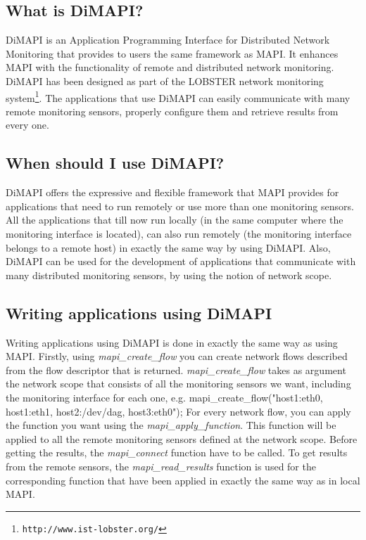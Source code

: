 \documentclass[a4paper, 11pt]{article}
\newenvironment{code}{\small\verbatim}{\endverbatim}
\begin{document}
\subsection{What is DiMAPI?}

DiMAPI is an Application Programming Interface for Distributed Network 
Monitoring that provides to users the same framework as MAPI.
It enhances MAPI with the functionality of remote and distributed network monitoring. 
DiMAPI has been designed as part of the LOBSTER network monitoring system\footnote{\tt http://www.ist-lobster.org/}.
The applications that use DiMAPI can easily communicate with many remote monitoring
sensors, properly configure them and retrieve results from every one.

\subsection{When should I use DiMAPI?}

DiMAPI offers the expressive and flexible framework that MAPI provides
for applications that need to run remotely or use more than one
monitoring sensors. All the applications that till now run locally
(in the same computer where the monitoring interface is located), can also
run remotely (the monitoring interface belongs to a remote host) in exactly 
the same way by using DiMAPI. Also, DiMAPI can be used for the development
of applications that communicate with many distributed monitoring sensors, 
by using the notion of network scope.

\subsection{Writing applications using DiMAPI}

Writing applications using DiMAPI is done in exactly the same way as using MAPI.
Firstly, using \textit{mapi\_create\_flow} you can create network flows described from
the flow descriptor that is returned. \textit{mapi\_create\_flow} takes as argument the network scope
that consists of all the monitoring sensors we want, including the monitoring 
interface for each one, e.g. 
  \begin{code}mapi_create_flow("host1:eth0, host1:eth1, host2:/dev/dag, host3:eth0");\end{code}
For every network flow, you can apply the function you want using the
\textit{mapi\_apply\_function}. This function will be applied to all the remote monitoring sensors defined
at the network scope.
Before getting the results, the \textit{mapi\_connect} function 
have to be called. To get results from the remote sensors, the \textit{mapi\_read\_results}
function is used for the corresponding function that have been applied in exactly the same way as in local MAPI.
\end{document}

